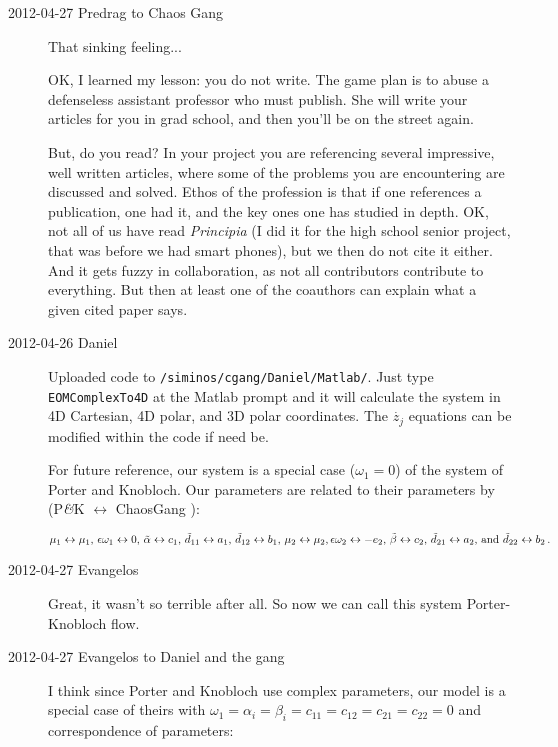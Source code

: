 \begin{description}
\item[2012-04-27 Predrag to Chaos Gang] That sinking feeling...

OK, I learned my lesson:
{you} do not write. The game plan is to abuse a defenseless assistant
professor who must publish. She will write your articles for you in grad
school, and then you'll be on the street again.

But, do you read? In your project you are referencing several impressive,
well written {\twoMode} articles, where some of the problems you are
encountering are discussed and solved. Ethos of the profession is that if
one references a publication, one had it, and the key ones one has
studied in depth. OK, not all of us have read \emph{Principia} (I did it
for the high school senior project, that was before we had smart
phones), but we then do not cite it either. And it gets fuzzy in
collaboration, as not all contributors contribute to everything. But then
at least one of the coauthors can explain what a given cited paper says.

\item[2012-04-26 Daniel] Uploaded code to
\texttt{/siminos/cgang/Daniel/Matlab/}. Just type \texttt{EOMComplexTo4D}
at the Matlab prompt and it will calculate the system in 4D Cartesian, 4D
polar, and 3D polar coordinates. The $\dot{z_j}$ equations can be
modified within the code if need be.

For future reference, our {\twoMode} system  is a
special case ($\omega_1 = 0$) of the system of Porter and
Knobloch. Our parameters are related to their parameters by
(P\textit{\&}K $\leftrightarrow$ ChaosGang {\twoMode}):

\(
  \mu_1 \leftrightarrow \mu_1,\, \epsilon \omega_1 \leftrightarrow 0,\,
  \tilde{\alpha} \leftrightarrow c_1,\, \tilde{d}_{11} \leftrightarrow a_1,\,
  \tilde{d}_{12} \leftrightarrow b_1,\, \mu_2 \leftrightarrow \mu_2,\,
  \\
  \epsilon \omega_2 \leftrightarrow -e_2,\, \tilde{\beta} \leftrightarrow c_2,\,
  \tilde{d}_{21} \leftrightarrow a_2,$ and  $\tilde{d}_{22} \leftrightarrow b_2
\,.
\)

\item[2012-04-27 Evangelos] Great, it wasn't so terrible after all. So
now we can call this system Porter-Knobloch flow.

\item[2012-04-27 Evangelos to Daniel and the gang]
I think since Porter and Knobloch  use complex parameters,
our model is a special case of theirs with $\omega_1=\alpha_i =\beta_i=c_{11}=c_{12}=c_{21}=c_{22} = 0$
and correspondence of parameters:


\end{description}
